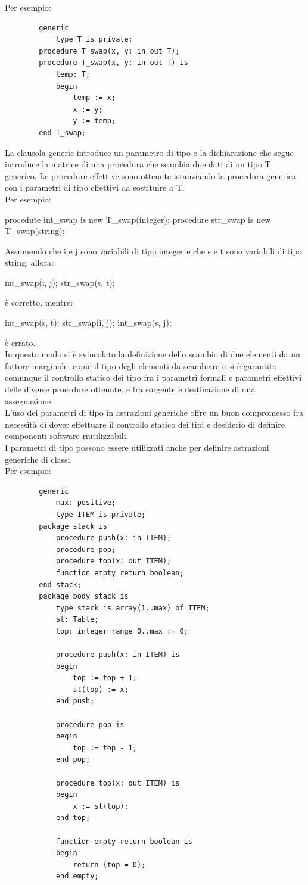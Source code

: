 \documentclass{article}
\begin{document}
	Per esempio:
	\begin{verbatim}
		generic
			type T is private;
		procedure T_swap(x, y: in out T);
		procedure T_swap(x, y: in out T) is
			temp: T;
			begin
				temp := x;
				x := y;
				y := temp;
		end T_swap;
	\end{verbatim}
	La clausola generic introduce un parametro di tipo e la dichiarazione che segue introduce la matrice di una procedura che scambia due dati di un tipo T generico. Le procedure effettive sono ottenute istanziando la procedura generica con i parametri di tipo effettivi da sostituire a T.\\
	Per esempio:
	\begin{center}
		procedute int\_swap is new T\_swap(integer);
		procedure str\_swap is new T\_swap(string);
	\end{center}
	Assumendo che i e j sono variabili di tipo integer e che s e t sono variabili di tipo string, allora:
	\begin{center}
		int\_swap(i, j);
		str\_swap(s, t);
	\end{center}
	è corretto, mentre:
	\begin{center}
		int\_swap(s, t);
		str\_swap(i, j);
		int\_swap(s, j);
	\end{center}
	è errato.
	\vspace{\baselineskip} \\
	In questo modo si è svincolato la definizione dello scambio di due elementi da un fattore marginale, come il tipo degli elementi da scambiare e si è garantito comunque il controllo statico dei tipo fra i parametri formali e parametri effettivi delle diverse procedure ottenute, e fra sorgente e destinazione di una assegnazione. \\
	L'uso dei parametri di tipo in astrazioni generiche offre un buon compromesso fra necessità di dover effettuare il controllo statico dei tipi e desiderio di definire componenti software riutilizzabili.
	\vspace{\baselineskip} \\
	I parametri di tipo possono essere utilizzati anche per definire astrazioni generiche di classi. \\
	Per esempio:
	\begin{verbatim}
		generic
			max: positive;
			type ITEM is private;
		package stack is
			procedure push(x: in ITEM);
			procedure pop;
			procedure top(x: out ITEM);
			function empty return boolean;
		end stack;
		package body stack is
			type stack is array(1..max) of ITEM;
			st: Table;
			top: integer range 0..max := 0;

			procedure push(x: in ITEM) is
			begin
				top := top + 1;
				st(top) := x;
			end push;

			procedure pop is
			begin
				top := top - 1;
			end pop;

			procedure top(x: out ITEM) is
			begin
				x := st(top);
			end top;

			function empty return boolean is
			begin
				return (top = 0);
			end empty;
	\end{verbatim}
\end{document}
